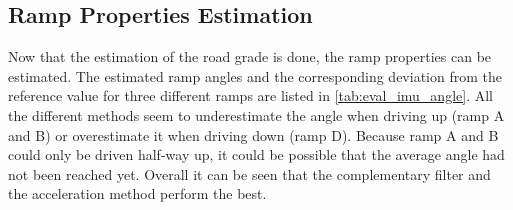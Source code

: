 \subsection{Ramp Properties Estimation}
Now that the estimation of the road grade is done, the ramp properties can be estimated.
The estimated ramp angles and the corresponding deviation from the reference value for three different ramps are listed in \cref{tab:eval_imu_angle}.
All the different methods seem to underestimate the angle when driving up (ramp A and B) or overestimate it when driving down (ramp D).
Because ramp A and B could only be driven half-way up, it could be possible that the average angle had not been reached yet.
Overall it can be seen that the complementary filter and the acceleration method perform the best.\par
\begin{table}[htb]
	\centering
	\caption{Estimation of ramp angle.}
	\label{tab:eval_imu_angle}
\end{table}
